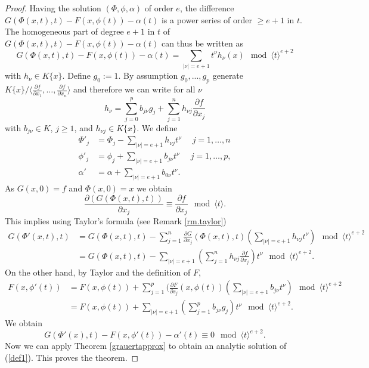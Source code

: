 \documentclass[11pt]{article}
\begin{document}
\begin{proof}
Having the solution $(\Phi,\phi,\alpha)$ of order $e$, the difference
$G(\Phi(x,t),t) - F(x,\phi(t)) - \alpha(t)$ is a power series of order $\ge e+1$ in $t$. The homogeneous part of degree $e+1$ in $t$ of
$G(\Phi(x,t),t) - F(x,\phi(t)) -\alpha(t)$ can thus be written as
\[
 G(\Phi(x,t),t) - F(x,\phi(t)) -\alpha(t) = \sum_{| \nu | = e+1}t^{\nu}h_{\nu}(x) \mod \langle t\rangle^{e+2}
\]
with $h_{\nu} \in K\{x\}$. 
Define $g_0:=1$. By assumption $g_0,...,g_p$ generate $K\{x\}/\langle\frac{\partial f}{\partial x_1},\ldots,\frac{\partial f}{\partial x_n}\rangle$ and therefore we can write for all $\nu$ 
\[
h_{\nu} =  \sum_{j=0}^{p}b_{j \nu}g_j + \sum_{j=1}^nh_{\nu j}
\frac{\partial f}{\partial x_j}
\]
with $b_{j \nu } \in K$, $j \ge 1$,  and $h_{\nu j} \in K\{ x\}$.
We define 
\begin{align*}
\Phi'_j &= \Phi_j - \sum_{|\nu | = e+1}{}{h_{\nu j}}t^\nu \; \quad
j=1,\ldots,n\\
\phi'_j &= \phi_j + \sum_{|\nu | = e+1}b_{j \nu}t^\nu\;\quad j = 1, \ldots, p,\\
\alpha' &= \alpha +\sum_{|\nu | = e+1}b_{0 \nu}t^\nu.
\end{align*}
As $G(x,0)= f$ and $\Phi(x,0)=x$ we obtain 
$$\frac{\partial{(G(\Phi(x,t),t))}}{\partial{x_j}}\equiv \frac{\partial f}{\partial x_j} \mod \langle t\rangle .$$
This implies using Taylor's formula (see Remark \ref{rm.taylor})
\begin{align*}
G(\Phi'(x,t),t)&=  G(\Phi(x,t),t)-\sum_{j=1}^n \frac{\partial G}{\partial x_j}(\Phi(x,t),t)(\sum_{|\nu | = e+1}{}{h_{\nu j}}t^\nu) \mod \langle t\rangle^{e+2}\\
&=  G(\Phi(x,t),t)-\sum_{|\nu | = e+1}(\sum_{j=1}^nh_{\nu j}\frac{\partial f}{\partial x_j} )t^\nu \mod \langle t\rangle^{e+2}.
\end{align*}
On the other hand, by Taylor and the definition of $F$,
\begin{align*}
F(x,\phi'(t))& = F(x,\phi(t)) +\sum_{j=1}^p(\frac{\partial F}{\partial s_j}(x,\phi(t))(\sum_{|\nu | = e+1}b_{j \nu}t^\nu) \mod \langle t\rangle^{e+2}\\
&=F(x,\phi(t))+\sum_{|\nu | = e+1}(\sum_{j=1}^p b_{j\nu}g_j)t^\nu \mod \langle t\rangle^{e+2}.
\end{align*}
We obtain
$$G(\Phi'(x),t)-F(x,\phi'(t))-\alpha'(t)\equiv 0 \mod \langle t\rangle^{e+2}.$$
Now we can apply Theorem \ref{grauertapprox} to obtain an analytic solution of (\ref{def1}).
This proves the theorem.
\end{proof}
\end{document}

